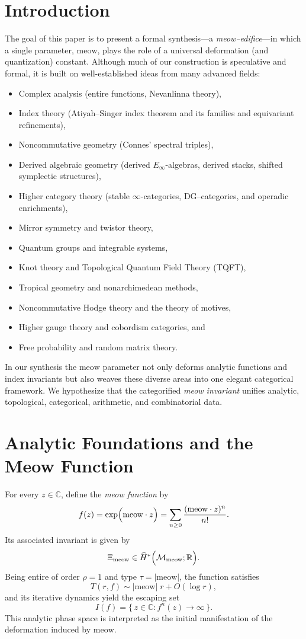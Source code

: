 \documentclass[11pt,a4paper]{article}
\newcommand{\meow}{\mathrm{meow}}
\newcommand{\Mmeow}{\mathcal{M}_{\meow}}
\theoremstyle{plain}
\theoremstyle{definition}
\theoremstyle{remark}
\begin{document}
\section{Introduction}
The goal of this paper is to present a formal synthesis---a \emph{meow--edifice}---in which a single parameter, \(\meow\), plays the role of a universal deformation (and quantization) constant. Although much of our construction is speculative and formal, it is built on well-established ideas from many advanced fields:
\begin{itemize}
    \item Complex analysis (entire functions, Nevanlinna theory),
    \item Index theory (Atiyah--Singer index theorem and its families and equivariant refinements),
    \item Noncommutative geometry (Connes’ spectral triples),
    \item Derived algebraic geometry (derived \(E_\infty\)-algebras, derived stacks, shifted symplectic structures),
    \item Higher category theory (stable \(\infty\)-categories, DG--categories, and operadic enrichments),
    \item Mirror symmetry and twistor theory,
    \item Quantum groups and integrable systems,
    \item Knot theory and Topological Quantum Field Theory (TQFT),
    \item Tropical geometry and nonarchimedean methods,
    \item Noncommutative Hodge theory and the theory of motives,
    \item Higher gauge theory and cobordism categories, and
    \item Free probability and random matrix theory.
\end{itemize}

In our synthesis the \(\meow\) parameter not only deforms analytic functions and index invariants but also weaves these diverse areas into one elegant categorical framework. We hypothesize that the categorified \emph{meow invariant} unifies analytic, topological, categorical, arithmetic, and combinatorial data.

\section{Analytic Foundations and the Meow Function}
For every \(z\in\mathbb{C}\), define the \emph{meow function} by
\[
    f(z) = \exp\Bigl(\meow \cdot z\Bigr)
    = \sum_{n\ge0}\frac{(\meow \cdot z)^n}{n!}.
\]
Its associated invariant is given by
\[
    \Xi_{\meow} \in \widehat{H}^{*}\Bigl(\Mmeow; \mathbb{R}\Bigr).
\]
Being entire of order \(\rho=1\) and type \(\tau=|\meow|\), the function satisfies
\[
    T(r,f) \sim |\meow|\;r + O(\log r),
\]
and its iterative dynamics yield the escaping set
\[
    I(f)=\{\,z\in\mathbb{C} : f^n(z)\to\infty\,\}.
\]
This analytic phase space is interpreted as the initial manifestation of the deformation induced by \(\meow\).
\end{document}
